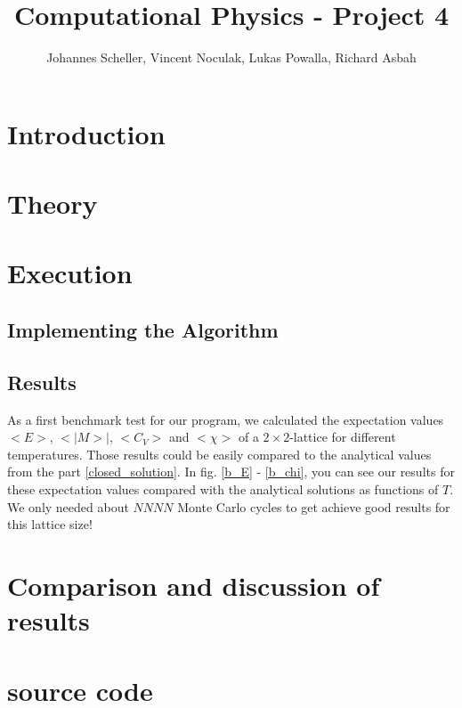 \documentclass[10pt,a4paper]{article}
\author{Johannes Scheller, Vincent Noculak, Lukas Powalla, Richard Asbah}
\title{Computational Physics - Project 4}
\begin{document}
\maketitle
\newpage
\tableofcontents
\newpage

\section*{Introduction}

\section{Theory}

\section{Execution}
\subsection{Implementing the Algorithm}
\subsection{Results}
As a first benchmark test for our program, we calculated the expectation values $<E>$, $<|M>|$, $<C_V>$ and $<\chi>$ of a $2\times2$-lattice for different temperatures. Those results could be easily compared to the analytical values from the part \ref{closed_solution}. In fig. \ref{b_E} - \ref{b_chi}, you can see our results for these expectation values compared with the analytical solutions as functions of $T$. We only needed about $NNNN$ Monte Carlo cycles to get achieve good results for this lattice size!
\section{Comparison and discussion of results}

\section{source code}
\end{document}
